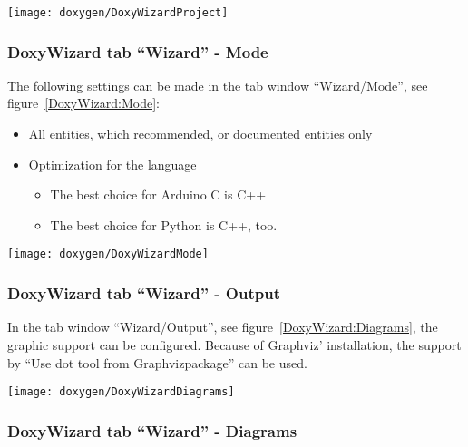 \begin{center}
	\texttt{[image: doxygen/DoxyWizardProject]}
	\label{DoxyWizard:Project}
\end{center} 
  

\subsubsection{DoxyWizard tab ``Wizard'' - Mode}

  
The following settings can be made in the tab window ``Wizard/Mode'', see figure~\ref{DoxyWizard:Mode}:

\begin{itemize}
  \item All entities, which recommended, or documented entities only
  \item Optimization for the language
    \begin{itemize}
    	\item The best choice for Arduino C is C++
    	\item The best choice for Python is C++, too.
    \end{itemize}
\end{itemize}


\begin{center}
	\texttt{[image: doxygen/DoxyWizardMode]}
	\label{DoxyWizard:Mode}
\end{center} 

\subsubsection{DoxyWizard tab ``Wizard'' - Output}


In the tab window ``Wizard/Output'', see figure~\ref{DoxyWizard:Diagrams}, the graphic support can be configured. Because of Graphviz' installation, the support by ``Use dot tool from Graphvizpackage'' can be used.


\begin{center}
	\texttt{[image: doxygen/DoxyWizardDiagrams]}
	\label{DoxyWizard:Diagrams}
\end{center} 

\subsubsection{DoxyWizard tab ``Wizard'' - Diagrams}


